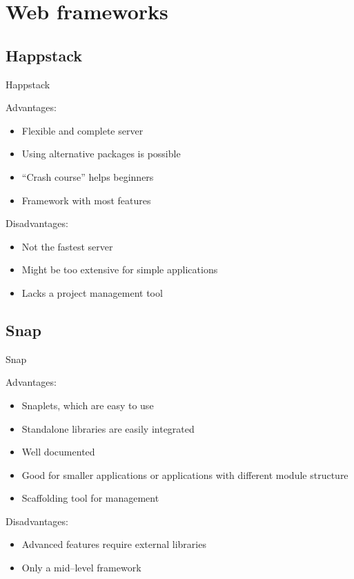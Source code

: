 \documentclass[10pt,usenames,dvipsnames]{beamer}
\begin{document}
	
	\section{Web frameworks}
		
	\subsection{Happstack}
	
	\begin{frame}{Happstack}
			
		Advantages:
		\begin{itemize}
			\item Flexible and complete server
			\item Using alternative packages is possible
			\item ``Crash course'' helps beginners
			\item Framework with most features
		\end{itemize}
		\pause
		Disadvantages:	
		\begin{itemize}
			\item Not the fastest server
			\item Might be too extensive for simple applications
			\item Lacks a project management tool
		\end{itemize}
	\end{frame}
	
	\subsection{Snap}
	
	\begin{frame}{Snap}
			
		Advantages:
		\begin{itemize}
			\item Snaplets, which are easy to use
			\item Standalone libraries are easily integrated
			\item Well documented
			\item Good for smaller applications or applications with different module structure
			\item Scaffolding tool for management
		\end{itemize}
		\pause
		Disadvantages:	
		\begin{itemize}
			\item Advanced features require external libraries
			\item Only a mid--level framework
		\end{itemize}
		
	\end{frame}
	
\end{document}
